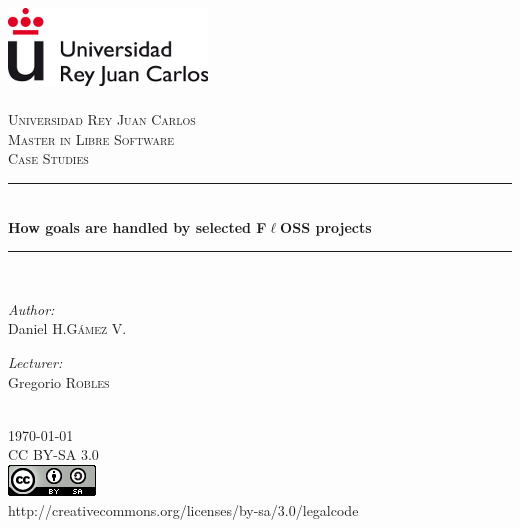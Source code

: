 \documentclass[11pt]{article} %
\begin{document}

\begin{titlepage}

\newcommand{\HRule}{\rule{\linewidth}{0.5mm}} %

\center %

\includegraphics{urjc} \\[0.5cm] %

\textsc{\LARGE \\Universidad Rey Juan Carlos}\\[1cm] %

\textsc{\Large Master in Libre Software}\\[0.5cm] %
\textsc{\large Case Studies}\\[0.5cm] %

\HRule \\[1.5cm]
{ \huge \bfseries How goals are handled by selected F$\ell$OSS projects}\\[0.4cm] %
\HRule \\[1.5cm]

\begin{minipage}{0.4\textwidth}
\begin{flushleft} \large
\emph{Author:}\\
Daniel H.\textsc{G\'amez V.} %
\end{flushleft}
\end{minipage}
\begin{minipage}{0.4\textwidth}
\begin{flushright} \large
\emph{Lecturer:} \\
Gregorio \textsc{Robles} %
\end{flushright}
\end{minipage}\\[1cm]

{\large \today}\\[1.8cm] %

\textsc CC BY-SA 3.0\\[0.2cm]
\includegraphics[scale=0.5]{license} \\ %
{\small http://creativecommons.org/licenses/by-sa/3.0/legalcode}\\

\vfill %

\end{titlepage}
\end{document}

